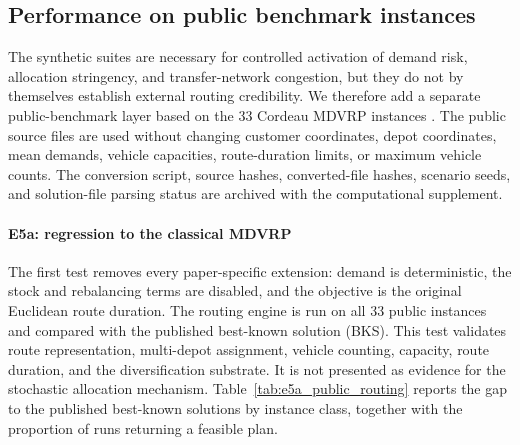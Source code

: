 \documentclass[authoryear,final,3p,times]{elsarticle}
\theoremstyle{definition}
\theoremstyle{plain}
\begin{document}
\subsection{Performance on public benchmark instances}
\label{subsec:e5_public_benchmark}

The synthetic suites are necessary for controlled activation of demand risk,
allocation stringency, and transfer-network congestion, but they do not by
themselves establish external routing credibility.  We therefore add a
separate public-benchmark layer based on the 33 Cordeau MDVRP instances
\citep{cordeau1997vrp}.  The public source files are used without changing
customer coordinates, depot coordinates, mean demands, vehicle capacities,
route-duration limits, or maximum vehicle counts.  The conversion script,
source hashes, converted-file hashes, scenario seeds, and solution-file parsing
status are archived with the computational supplement.

\paragraph{E5a: regression to the classical MDVRP}
The first test removes every paper-specific extension: demand is deterministic,
the stock and rebalancing terms are disabled, and the objective is the original
Euclidean route duration.  The routing engine is run on all 33 public instances
and compared with the published best-known solution (BKS).  This test validates
route representation, multi-depot assignment, vehicle counting, capacity,
route duration, and the diversification substrate.  It is not presented as
evidence for the stochastic allocation mechanism.
Table~\ref{tab:e5a_public_routing} reports the gap to the published
best-known solutions by instance class, together with the proportion of runs
returning a feasible plan.

\begin{table}[!htbp]
\centering
\caption{Routing performance on the public MDVRP benchmark (E5a), over all 33 Cordeau instances.}
\label{tab:e5a_public_routing}
\end{table}
\end{document}
